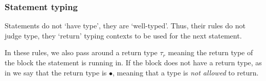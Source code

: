 \documentclass[11pt,a4paper]{article}
\newcommand{\kw}[1]{\mathtt{#1}}                     %
\newcommand{\rn}[1]{\TirNameStyle{#1}}
\begin{document}
\subsubsection{Statement typing}

Statements do not `have type', they are `well-typed'. Thus, their rules do not judge type, they `return' typing contexts to be used for the next statement.

In these rules, we also pass around a return type $\tau_r$ meaning the return type of the block the statement is running in. If the block does not have a return type, as in \rn{TP-PROG} we say that the return type is $\bullet$, meaning that a type is \textit{not allowed} to return.
\end{document}
